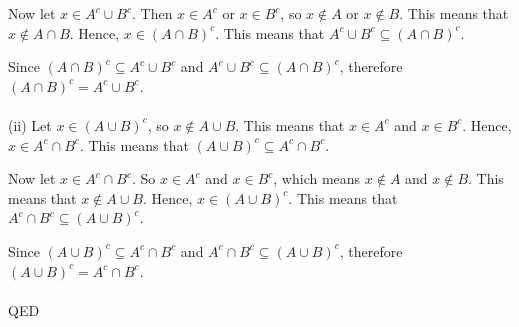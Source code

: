 \documentclass{article}
\begin{document}
    Now let $x \in A^c \cup B^c$. Then $x \in A^c$ or $x \in B^c$, so $x \notin A$ or $x \notin B$. This means that $x \notin A \cap B$. Hence, $x \in (A \cap B)^c$. This means that $A^c \cup B^c \subseteq (A \cap B)^c$.
    
    Since $(A \cap B)^c \subseteq A^c \cup B^c$ and $A^c \cup B^c \subseteq (A \cap B)^c$, therefore $(A \cap B)^c = A^c \cup B^c$.
    \\ \\
    (ii) Let $x \in (A \cup B)^c$, so $x \notin A \cup B$. This means that $x \in A^c$ and $x \in B^c$. Hence, $x \in A^c \cap B^c$. This means that $(A \cup B)^c \subseteq A^c \cap B^c$.
    
    Now let $x \in A^c \cap B^c$. So $x \in A^c$ and $x \in B^c$, which means $x \notin A$ and $x \notin B$. This means that $x \notin A \cup B$. Hence, $x \in (A \cup B)^c$. This means that $A^c \cap B^c \subseteq (A \cup B)^c$.
    
    Since $(A \cup B)^c \subseteq A^c \cap B^c$ and $A^c \cap B^c \subseteq (A \cup B)^c$, therefore $(A \cup B)^c = A^c \cap B^c$.\\ \\
    QED
\end{document}
